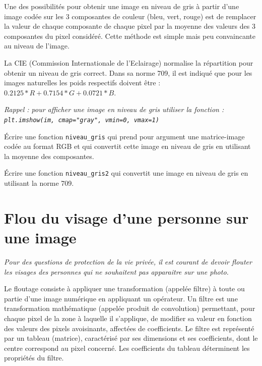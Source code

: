 Une des possibilités pour obtenir une image en niveau de gris à partir d’une image codée sur les 3 composantes de couleur (bleu, vert, rouge) est de remplacer la valeur de chaque composante de chaque pixel par la moyenne des valeurs des 3 composantes du pixel considéré. Cette méthode est simple mais peu convaincante au niveau de l’image.

La CIE (Commission Internationale de l’Eclairage) normalise la répartition pour obtenir un niveau de gris correct. Dans sa norme 709, il est indiqué que pour les images naturelles les poids respectifs doivent être : $0.2125 * R + 0.7154 * G + 0.0721 * B.$

\textit{Rappel : pour afficher une image en niveau de gris utiliser la fonction : \texttt{plt.imshow(im, cmap="gray", vmin=0, vmax=1)}}

\begin{question}
Écrire une fonction \texttt{niveau\_gris} qui prend pour argument une matrice-image codée au format RGB et qui convertit cette image en niveau de gris en utilisant la moyenne des composantes.
\end{question}

\begin{question} %
Écrire une fonction \texttt{niveau\_gris2} qui convertit une image en niveau de gris en utilisant la norme 709.
\end{question}





\section*{Flou du visage d'une personne sur une image}


\textit{Pour des questions de protection de la vie privée, il est courant de devoir flouter les visages des personnes qui ne souhaitent pas apparaitre sur une photo. }

Le floutage consiste à appliquer une transformation (appelée filtre) à toute ou partie d’une image numérique en  appliquant un opérateur.  Un filtre est une transformation mathématique (appelée produit de convolution) permettant, pour chaque pixel  de la zone à laquelle il s’applique, de modifier sa valeur en fonction des valeurs des pixels avoisinants, affectées de coefficients. 
 Le filtre est représenté par un tableau (matrice), caractérisé par ses dimensions et ses coefficients, dont le centre
 correspond au pixel concerné. Les coefficients du tableau déterminent les propriétés du filtre.

